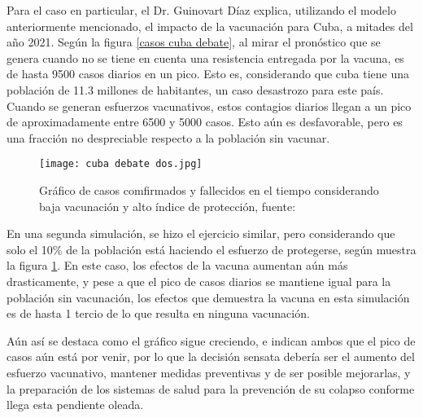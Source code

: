 Para el caso en particular, el Dr. Guinovart Díaz explica, utilizando el modelo anteriormente mencionado, el impacto de la vacunación para Cuba, a mitades del año 2021. Según la figura \ref{casos cuba debate}, al mirar el pronóstico que se genera cuando no se tiene en cuenta una resistencia entregada por la vacuna, es de hasta 9500 casos diarios en un pico. Esto es, considerando que cuba tiene una población de 11.3 millones de habitantes, un caso desastrozo para este país. Cuando se generan esfuerzos vacunativos, estos contagios diarios llegan a un pico de aproximadamente entre 6500 y 5000 casos. Esto aún es desfavorable, pero es una fracción no despreciable respecto a la población sin vacunar.

\begin{figure}
    \texttt{[image: cuba debate dos.jpg]}
    \caption{Gráfico de casos comfirmados y fallecidos en el tiempo considerando baja vacunación y alto índice de protección, fuente: \cite{falcon_reinaldo_arcemontero_izquieroferrer_farinasacostarodriguezmartines_2021}}
    \label{casos cuba debate dos}
\end{figure}

En una segunda simulación, se hizo el ejercicio similar, pero considerando que solo el 10\% de la población está haciendo el esfuerzo de protegerse, según muestra la figura \ref{casos cuba debate dos}. En este caso, los efectos de la vacuna aumentan aún más drasticamente, y pese a que el pico de casos diarios se mantiene igual para la población sin vacunación, los efectos que demuestra la vacuna en esta simulación es de hasta 1 tercio de lo que resulta en ninguna vacunación.

Aún así se destaca como el gráfico sigue creciendo, e indican ambos que el pico de casos aún está por venir, por lo que la decisión sensata debería ser el aumento del esfuerzo vacunativo, mantener medidas preventivas y de ser posible mejorarlas, y la preparación de los sistemas de salud para la prevención de su colapso conforme llega esta pendiente oleada.
